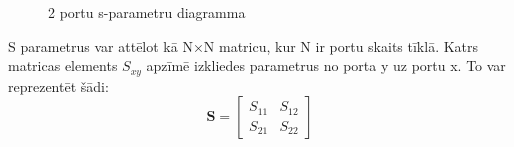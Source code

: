 \begin{figure}[H]
	\centering
    
    \hspace{1cm}
    \caption{2 portu s-parametru diagramma}
\end{figure}
S parametrus var attēlot kā N×N matricu, kur N ir portu skaits tīklā. Katrs matricas elements $S_{xy}$ apzīmē izkliedes parametrus no porta y uz portu x. To var reprezentēt šādi:
\[
\mathbf{S} = \begin{bmatrix}
  S_{11} & S_{12} \\
  S_{21} & S_{22}
\end{bmatrix}
\]